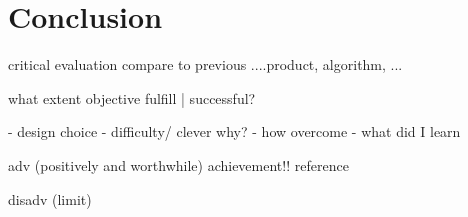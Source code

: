 \chapter{Conclusion}

critical evaluation compare to previous ....product, algorithm, ...

what extent objective fulfill |  successful?

 - design choice 
 - difficulty/ clever why?
 - how overcome 
 - what did I learn

adv (positively and worthwhile) achievement!!  reference 

disadv (limit)
